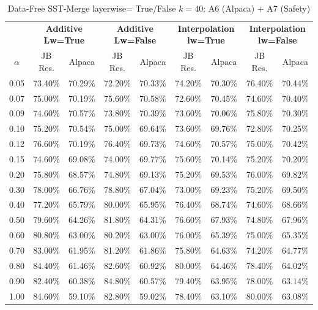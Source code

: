 \begin{table}[h]
\centering
\caption{Data-Free SST-Merge layerwise= True/False $k=40$: A6 (Alpaca) + A7 (Safety)}
\label{tab:res_a6_data_free_sst_40}
\begin{tabular}{c|cc|cc|cc|cc}
\hline
 & \multicolumn{2}{c|}{\textbf{Additive Lw=True}} & \multicolumn{2}{c|}{\textbf{Additive Lw=False}} & \multicolumn{2}{c|}{\textbf{Interpolation lw=True}}& \multicolumn{2}{c}{\textbf{Interpolation lw=False}} \\
$\alpha$ & JB Res. & Alpaca & JB Res. & Alpaca & JB Res. & Alpaca & JB Res. & Alpaca \\
\hline
0.05 & 73.40\% & 70.29\% & 72.20\% & 70.33\% & 74.20\% & 70.30\% & 76.40\% & 70.44\% \\
0.07 & 75.00\% & 70.19\% & 75.60\% & 70.58\% & 72.60\% & 70.45\% & 74.60\% & 70.40\% \\
0.09 & 74.60\% & 70.57\% & 73.80\% & 70.39\% & 73.60\% & 70.06\% & 75.80\% & 70.30\% \\
0.10 & 75.20\% & 70.54\% & 75.00\% & 69.64\% & 73.60\% & 69.76\% & 72.80\% & 70.25\% \\
0.12 & 76.60\% & 70.19\% & 76.40\% & 69.73\% & 74.60\% & 70.57\% & 75.00\% & 70.42\% \\
0.15 & 74.60\% & 69.08\% & 74.00\% & 69.77\% & 75.60\% & 70.14\% & 75.20\% & 70.20\% \\
0.20 & 75.80\% & 68.57\% & 74.80\% & 69.13\% & 75.20\% & 69.53\% & 76.00\% & 69.82\% \\
0.30 & 78.00\% & 66.76\% & 78.80\% & 67.04\% & 73.00\% & 69.23\% & 75.20\% & 69.50\% \\
0.40 & 77.20\% & 65.79\% & 80.00\% & 65.95\% & 76.40\% & 68.74\% & 74.60\% & 68.66\% \\
0.50 & 79.60\% & 64.26\% & 81.80\% & 64.31\% & 76.60\% & 67.93\% & 74.80\% & 67.96\% \\
0.60 & 80.80\% & 63.00\% & 80.20\% & 63.00\% & 76.00\% & 65.39\% & 75.00\% & 65.35\% \\
0.70 & 83.00\% & 61.95\% & 81.20\% & 61.86\% & 75.80\% & 64.63\% & 74.20\% & 64.77\% \\
0.80 & 84.40\% & 61.46\% & 82.60\% & 60.92\% & 80.00\% & 64.46\% & 78.40\% & 64.02\% \\
0.90 & 82.40\% & 60.38\% & 84.80\% & 60.57\% & 79.40\% & 63.95\% & 78.00\% & 63.14\% \\
1.00 & 84.60\% & 59.10\% & 82.80\% & 59.02\% & 78.40\% & 63.10\% & 80.00\% & 63.08\% \\
\hline
\end{tabular}
\end{table}
\FloatBarrier

